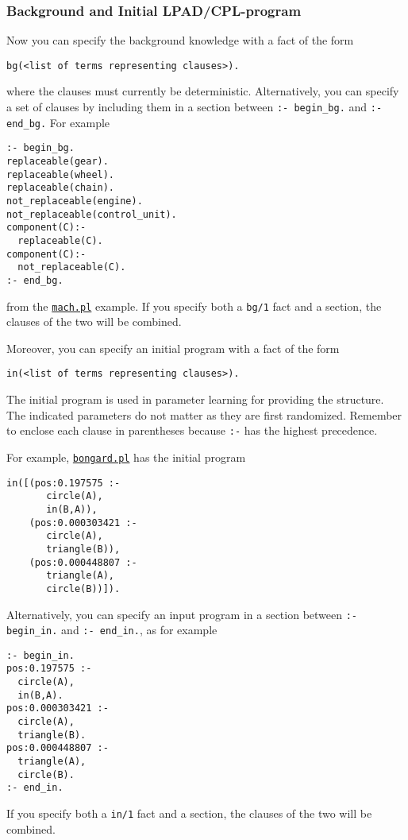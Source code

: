 \subsubsection{Background and Initial LPAD/CPL-program}
%
Now you can specify the background knowledge with a 
fact of the form 
\begin{verbatim}
bg(<list of terms representing clauses>).
\end{verbatim}
where the clauses must currently be deterministic.
Alternatively, you can specify a set of clauses by including them in 
a section between
\verb|:- begin_bg.| and \verb|:- end_bg.| For example
\begin{verbatim}
:- begin_bg.
replaceable(gear).
replaceable(wheel).
replaceable(chain).
not_replaceable(engine).
not_replaceable(control_unit).
component(C):-
  replaceable(C).
component(C):-
  not_replaceable(C).
:- end_bg.
\end{verbatim}
from the \href{http://cplint.eu/example/learning/mach.pl}{\texttt{mach.pl}} example.
If you specify both a \verb|bg/1| fact and a section, the clauses of the two will be combined.


Moreover, you can specify an initial program with a fact of the form 
\begin{verbatim}
in(<list of terms representing clauses>).
\end{verbatim}
The initial program is used in parameter learning for providing 
the structure. The indicated parameters do not matter as they are first randomized.
Remember to enclose each clause in parentheses because \verb|:-| has the highest precedence.

For example, \href{http://cplint.eu/example/learning/bongard.pl}{\texttt{bongard.pl}} has the initial program 
\begin{verbatim}
in([(pos:0.197575 :-
       circle(A),
       in(B,A)),
    (pos:0.000303421 :-
       circle(A),
       triangle(B)), 
    (pos:0.000448807 :-
       triangle(A),
       circle(B))]).
\end{verbatim}
Alternatively, you can specify an input program in a section between \verb|:- begin_in.| and \verb|:- end_in.|, as for example
\begin{verbatim}
:- begin_in.
pos:0.197575 :-
  circle(A),
  in(B,A).
pos:0.000303421 :-
  circle(A),
  triangle(B).
pos:0.000448807 :-
  triangle(A),
  circle(B).
:- end_in.
\end{verbatim}
If you specify both a \verb|in/1| fact and a section, the clauses of the two will be combined.



